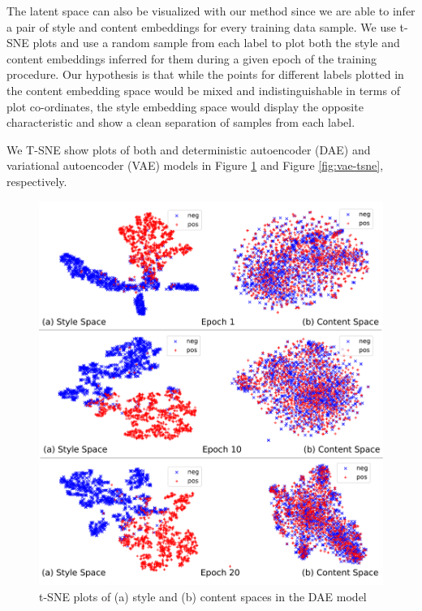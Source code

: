 The latent space can also be visualized with our method since we are able to infer a pair of style and content embeddings for every training data sample. We use t-SNE plots \cite{maaten2008visualizing} and use a random sample from each label to plot both the style and content embeddings inferred for them during a given epoch of the training procedure. Our hypothesis is that while the points for different labels plotted in the content embedding space would be mixed and indistinguishable in terms of plot co-ordinates, the style embedding space would display the opposite characteristic and show a clean separation of samples from each label.

We T-SNE show plots of both and deterministic autoencoder (DAE) and variational autoencoder (VAE) models in Figure \ref{fig:dae-tsne} and Figure \ref{fig:vae-tsne}, respectively.

\begin{figure}[ht]
	\includegraphics[width=\linewidth]{images/dae-latent-spaces}
	\caption{t-SNE plots of (a) style and (b) content spaces in the DAE model}
	\label{fig:dae-tsne}
\end{figure}


